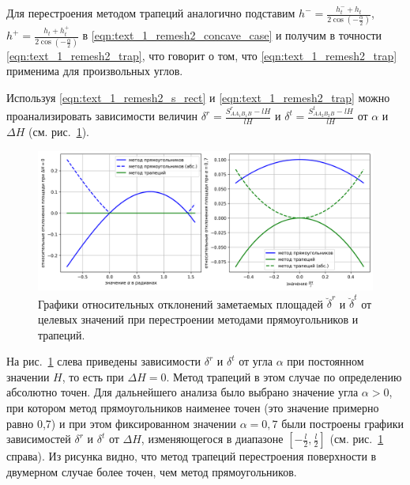 Для перестроения методом трапеций аналогично подставим $h^{-} = \frac{h_t^{-} + h_t}{2 \cos\left( -\frac{\alpha}{2} \right)}$, $h^{+} = \frac{h_t + h_t^{+}}{2 \cos\left( -\frac{\alpha}{2} \right)}$ в \eqref{eqn:text_1_remesh2_concave_case} и получим в точности \eqref{eqn:text_1_remesh2_trap}, что говорит о том, что \eqref{eqn:text_1_remesh2_trap} применима для произвольных углов.

Используя \eqref{eqn:text_1_remesh2_s_rect} и \eqref{eqn:text_1_remesh2_trap} можно проанализировать зависимости величин $\delta^r = \frac{S_{AA_1B_1B}^r - lH}{lH}$ и $\delta^t = \frac{S_{AA_2B_2B}^t - lH}{lH}$ от $\alpha$ и $\Delta H$ (см. рис.~\ref{fig:text_1_remesh_2d_main_chart}).

\begin{figure}[ht]
\centering
\includegraphics[width=1.0\textwidth]{pics/text_1_remesh_2d/main_chart.png}
\singlespacing
{}\caption{Графики относительных отклонений заметаемых площадей $\breve{\delta}^r$ и $\breve{\delta}^t$ от целевых значений при перестроении методами прямоугольников и трапеций.}
\label{fig:text_1_remesh_2d_main_chart}
\end{figure}

На рис.~\ref{fig:text_1_remesh_2d_main_chart} слева приведены зависимости $\delta^r$ и $\delta^t$ от угла $\alpha$ при постоянном значении $H$, то есть при $\Delta H = 0$.
Метод трапеций в этом случае по определению абсолютно точен.
Для дальнейшего анализа было выбрано значение угла $\alpha > 0$, при котором метод прямоугольников наименее точен (это значение примерно равно 0,7) и при этом фиксированном значении $\alpha = 0,7$ были построены графики зависимостей $\delta^r$ и $\delta^t$ от $\Delta H$, изменяющегося в диапазоне $[-\frac{l}{2}, \frac{l}{2}]$ (см. рис.~\ref{fig:text_1_remesh_2d_main_chart} справа).
Из рисунка видно, что метод трапеций перестроения поверхности в двумерном случае более точен, чем метод прямоугольников.
